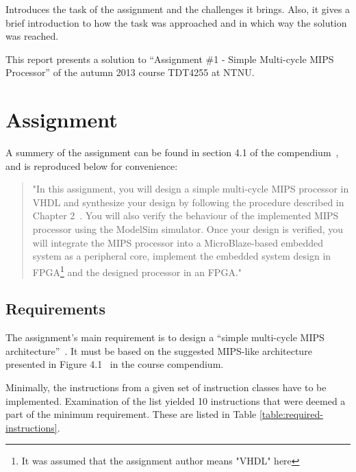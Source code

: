 Introduces the task of the assignment and the challenges it
brings.
Also, it gives a brief introduction to how the task was approached and in which way the solution was reached.


This report presents a solution to ``Assignment \#1 - Simple Multi-cycle MIPS Processor'' of the autumn 2013 course TDT4255 at NTNU.

\section{Assignment}

A summery of the assignment can be found in section 4.1 of the compendium~\cite[p.114]{compendium}, and is reproduced below for convenience:

\begin{quote}
"In this assignment, you will design a simple multi-cycle MIPS processor in VHDL and synthesize your design by following the procedure described in Chapter 2~\cite[of the compendium]{compendium}.
You will also verify the behaviour of the implemented MIPS processor using the ModelSim simulator.
Once your design is verified, you will integrate the MIPS processor into a MicroBlaze-based embedded system as a peripheral core, implement the embedded system design in FPGA\footnote{It was assumed that the assignment author means "VHDL" here} and the designed processor in an FPGA."
\end{quote}

\subsection{Requirements}

The assignment's main requirement is to design a ``simple multi-cycle MIPS architecture''~\cite[p.114]{compendium}. It must be based on the suggested MIPS-like architecture presented in Figure 4.1~\cite[p.115]{compendium} in the course compendium.

Minimally, the instructions from a given set of instruction classes have to be implemented. 
Examination of the list yielded 10 instructions that were deemed a part of the minimum requirement.
These are listed in Table \ref{table:required-instructions}.

